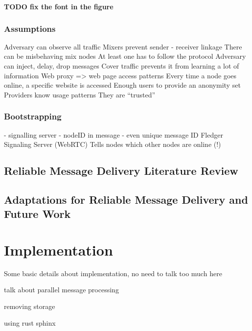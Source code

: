 \documentclass[a4paper,11pt,oneside]{report}
\begin{document}
\textbf{TODO fix the font in the figure}

\subsection{Assumptions}
Adversary can observe all traffic
Mixers prevent sender - receiver linkage
There can be misbehaving mix nodes
At least one has to follow the protocol
Adversary can inject, delay, drop messages
Cover traffic prevents it from learning a lot of information
Web proxy => web page access patterns
Every time a node goes online, a specific website is accessed
Enough users to provide an anonymity set
Providers know usage patterns
They are “trusted”

\subsection{Bootstrapping}
- signalling server
- nodeID in message
- even unique message ID
Fledger Signaling Server (WebRTC)
Tells nodes which other nodes are online (!)

\section{Reliable Message Delivery Literature Review}

\section{Adaptations for Reliable Message Delivery and Future Work}

\chapter{Implementation}



Some basic details about implementation, no need to talk too much here

talk about parallel message processing

removing storage

using rust sphinx
\end{document}
